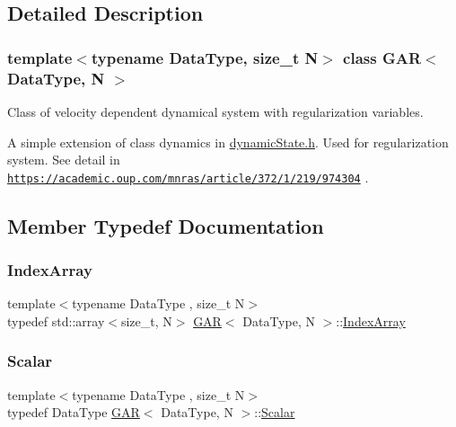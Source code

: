 \subsection{Detailed Description}
\subsubsection*{template$<$typename Data\+Type, size\+\_\+t N$>$\newline
class G\+A\+R$<$ Data\+Type, N $>$}

Class of velocity dependent dynamical system with regularization variables. 

A simple extension of class dynamics in \mbox{\hyperlink{dynamic_state_8h}{dynamic\+State.\+h}}. Used for regularization system. See detail in \href{https://academic.oup.com/mnras/article/372/1/219/974304}{\tt https\+://academic.\+oup.\+com/mnras/article/372/1/219/974304} . 

\subsection{Member Typedef Documentation}
\mbox{\label{class_g_a_r_aaf033049c0cd8f0f86a82b9595086fa5}} 
\subsubsection{\texorpdfstring{Index\+Array}{IndexArray}}
{\footnotesize\ttfamily template$<$typename Data\+Type , size\+\_\+t N$>$ \\
typedef std\+::array$<$size\+\_\+t, N$>$ \mbox{\hyperlink{class_g_a_r}{G\+AR}}$<$ Data\+Type, N $>$\+::\mbox{\hyperlink{class_g_a_r_aaf033049c0cd8f0f86a82b9595086fa5}{Index\+Array}}}

\mbox{\label{class_g_a_r_a2ae44eda8e28d5dd26cf707dcda69314}} 
\subsubsection{\texorpdfstring{Scalar}{Scalar}}
{\footnotesize\ttfamily template$<$typename Data\+Type , size\+\_\+t N$>$ \\
typedef Data\+Type \mbox{\hyperlink{class_g_a_r}{G\+AR}}$<$ Data\+Type, N $>$\+::\mbox{\hyperlink{class_g_a_r_a2ae44eda8e28d5dd26cf707dcda69314}{Scalar}}}

